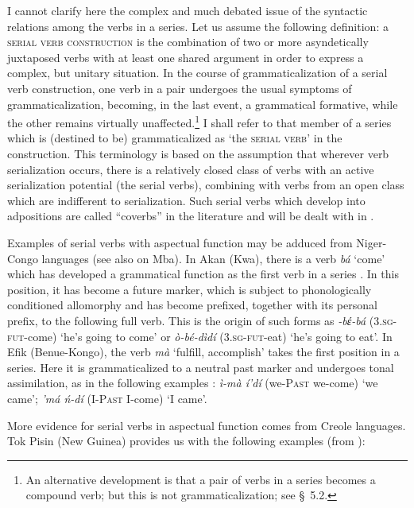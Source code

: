 \label{page37}I cannot clarify here the complex and much debated issue of the syntactic relations among the verbs in a series. Let us assume the following definition: a \textsc{serial verb construction} is the combination of two or more asyndetically juxtaposed verbs with at least one shared argument in order to express a complex, but unitary situation. In the course of grammaticalization of a serial verb construction, one verb in a pair undergoes the usual symptoms of grammaticalization, becoming, in the last event, a grammatical formative, while the other remains virtually unaffected.\footnote{An alternative development is that a pair of verbs in a series becomes a compound verb; but this is not grammaticalization; see §~5.2.} I shall refer to that member of a series which is (destined to be) grammaticalized as ‘the \textsc{serial verb}’ in the construction. This terminology is based on the assumption that wherever verb serialization occurs, there is a relatively closed class of verbs with an active serialization potential (the serial verbs), combining with verbs from an open class which are indifferent to serialization. Such serial verbs which develop into adpositions are called ``coverbs'' in the literature and will be dealt with in .

Examples of serial verbs with aspectual function may be adduced from Niger-Congo languages (see also \citealt[113--117]{Sasse1977a} on Mba). In Akan (Kwa), there is a verb \textit{bá} ‘come’ which has developed a grammatical function as the first verb in a series \citep[353f]{Welmers1973}. In this position, it has become a future marker, which is subject to phonologically conditioned allomorphy and has become prefixed, together with its personal prefix, to the following full verb. This is the origin of such forms as \textit{{}-bέ-bá} (3.\textsc{sg-fut}{}-come) ‘he's going to come’ or \textit{ò-bé-dìdí} (3.\textsc{sg-fut}{}-eat) ‘he's going to eat’. In Efik (Benue-Kongo), the verb \textit{mà} ‘fulfill, accomplish’ takes the first position in a series. Here it is grammaticalized to a neutral past marker and undergoes tonal assimilation, as in the following examples \citep[371]{Welmers1973}: \textit{ì-mà í'dí }(we-\textsc{Past} we-come) ‘we came’; \textit{'má ń-dí} (I-\textsc{Past} I-come) ‘I came’.

More evidence for serial verbs in aspectual function comes from Creole languages. Tok Pisin (New Guinea) provides us with the following examples (from \citealt{Mosel1980}):

